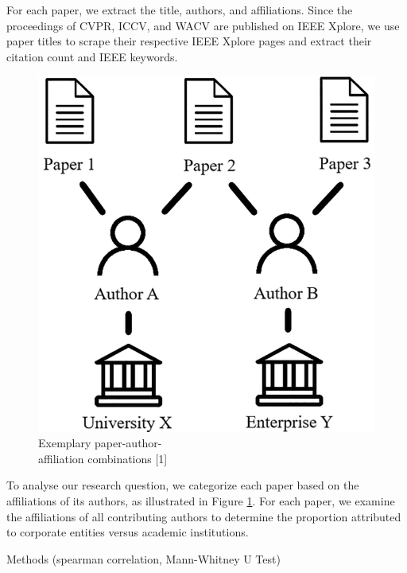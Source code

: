 \documentclass{article}
\begin{document}
For each paper, we extract the title, authors, and affiliations. Since the proceedings of CVPR, ICCV, and WACV are published on IEEE Xplore, we use paper titles to scrape their respective IEEE Xplore pages and extract their citation count and IEEE keywords.

\begin{figure}
\centering
\vspace{-10pt}
\includegraphics[width=.95\linewidth]{report/images/affiliation-combination.png}
\caption{Exemplary paper-author-\\
affiliation combinations [1]}
\label{fig:affiliation-combination}
\vspace{-50pt}
\end{figure}
To analyse our research question, we categorize each paper based on the affiliations of its authors, as illustrated in Figure \ref{fig:affiliation-combination}. For each paper, we examine the affiliations of all contributing authors to determine the proportion attributed to corporate entities versus academic institutions.




Methods (spearman correlation, Mann-Whitney U Test)

\clearpage
\end{document}

